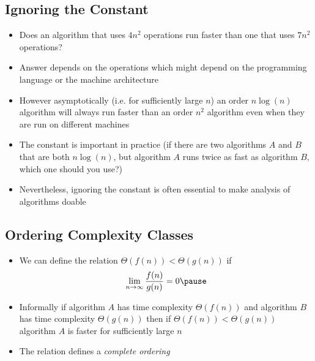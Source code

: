 
\begin{slide}
\section[-2]{Ignoring the Constant}

\begin{PauseHighLight}
  \begin{itemize}
  \item Does an algorithm that uses $4 n^2$ operations run faster than
    one that uses $7 n^2$ operations?\pause
  \item Answer depends on the operations which might depend on the
    programming language or the machine architecture\pauseb
  \item However asymptotically (i.e. for sufficiently large $n$) an order
    $n\log(n)$ algorithm will always run faster than an order $n^2$
    algorithm\pauseb{} even when they are run on different
    machines\pauseb
  \item The constant is important in practice (if there are two algorithms
    $A$ and $B$ that are both $n\log(n)$, but algorithm $A$ runs twice
    as fast as algorithm $B$, which one should you use?)\pauseb
  \item Nevertheless, ignoring the constant is often essential to make
    analysis of algorithms doable\pauseb
  \end{itemize}
\end{PauseHighLight}

\end{slide}


\begin{slide}
\section{Ordering Complexity Classes}

\begin{PauseHighLight}
  \begin{itemize}
  \item We can define the relation $\Theta(f(n))<\Theta(g(n))$
    if
    \begin{align*}
      \lim_{n\rightarrow\infty} \frac{f(n)}{g(n)} = 0\pause
    \end{align*}
  \item Informally if algorithm $A$ has time complexity $\Theta(f(n))$
    and algorithm $B$ has time complexity $\Theta(g(n))$ then if
    $\Theta(f(n))<\Theta(g(n))$ algorithm $A$ is faster for sufficiently
    large $n$\pause
  \item The relation defines a \emph{complete ordering}\pause
  \end{itemize}
\end{PauseHighLight}

\end{slide}


